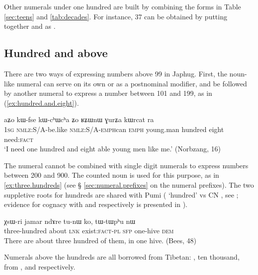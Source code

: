Other numerals under one hundred are built by combining the forms in Table \ref{sec:teens} and \ref{tab:decades}. For instance, 37 can be obtained by putting together  and  as .

\subsection{Hundred and above} \label{sec.hundred.plus}
 There are two ways of expressing numbers above 99 in Japhug. First, the noun-like numeral  can serve on its own or as a postnominal modifier, and be followed by another numeral to express a number between 101 and 199, as in (\ref{ex:hundred.and.eight}).

\begin{exe}
\ex \label{ex:hundred.and.eight}
\gll aʑo 	kɯ-fse 	kɯ-cʰɯ\redp{}cʰa 	ʑo 	ʁʑɯnɯ 	ɣurʑa 	kɯrcat 	ra \\
\textsc{1sg} \textsc{nmlz}:S/A-be.like  \textsc{nmlz}:S/A-\textsc{emph}\redp{}can \textsc{emph} young.man hundred eight need:\textsc{fact} \\
\glt `I need one hundred and eight able young men like me.' (Norbzang, 16)
\end{exe}

The numeral  cannot be combined with single digit numerals to express numbers between 200 and 900. The counted noun  is used for this purpose, as in \ref{ex:three.hundreds} (see § \ref{sec:numeral.prefixes} on the numeral prefixes). The two suppletive roots for hundreds are shared with Pumi ( `hundred' vs CN , see \citealt[101]{daudey14grammar}; evidence for cognacy with  and  respectively is presented in \citealt{jacques17num}).

\begin{exe}
\ex \label{ex:three.hundreds}
\gll χsɯ-ri 	jamar 	ndɤre 	tu-nɯ 	ko, 	tɯ-tɯpʰu 	nɯ \\
three-hundred about \textsc{lnk} exist:\textsc{fact-pl} \textsc{sfp} one-hive \textsc{dem} \\
\glt There are about three hundred of them, in one hive. (Bees, 48)
\end{exe}
 
  Numerals above the hundreds are all borrowed from Tibetan: ,  {ten thousand},  from ,  and  respectively.  

